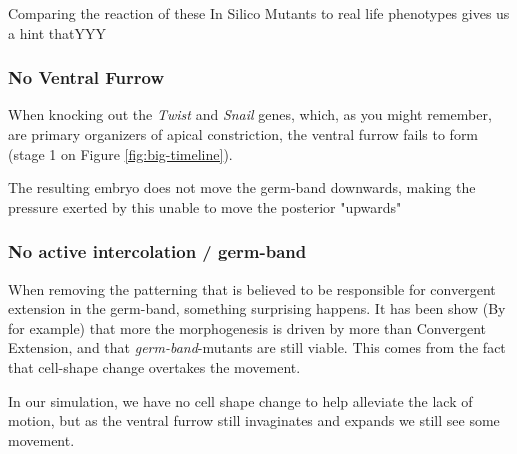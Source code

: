 Comparing the reaction of these In Silico Mutants to real life phenotypes gives us a hint thatYYY

\subsubsection{No Ventral Furrow}
When knocking out the \textit{Twist} and \textit{Snail} genes, which, as you might remember, are primary organizers of apical constriction, the ventral furrow fails to form (stage 1 on Figure \ref{fig:big-timeline}).

The resulting embryo does not move the germ-band downwards, making the pressure exerted by this unable to move the posterior "upwards" 






\subsubsection{No active intercolation / germ-band}
\label{sec:mutantNoGB}

When removing the patterning that is believed to be responsible for convergent extension in the germ-band, something surprising happens. It has been show (By  for example) that more the morphogenesis is driven by more than Convergent Extension, and that \textit{germ-band}-mutants are still viable. This comes from the fact that cell-shape change overtakes the movement.

In our simulation, we have no cell shape change to help alleviate the lack of motion, but as the ventral furrow still invaginates and expands we still see some movement. 



